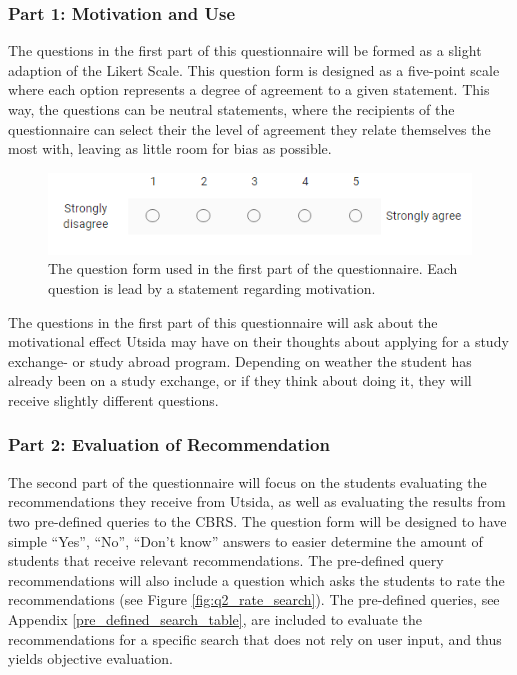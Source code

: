\subsubsection{Part 1: Motivation and Use}
The questions in the first part of this questionnaire will be formed as a slight adaption of the Likert Scale\cite{likert1932technique}. This question form is designed as a five-point scale where each option represents a degree of agreement to a given statement. This way, the questions can be neutral statements, where the recipients of the questionnaire can select their the level of agreement they relate themselves the most with, leaving as little room for bias as possible. 

\begin{figure}[H]
    \centering
    \includegraphics[width=1\textwidth]{fig/q2_question_form.PNG}
    \caption{The question form used in the first part of the questionnaire. Each question is lead by a statement regarding motivation.}
    \label{fig:q2_question_form}
\end{figure}

The questions in the first part of this questionnaire will ask about the motivational effect Utsida may have on their thoughts about applying for a study exchange- or study abroad program. Depending on weather the student has already been on a study exchange, or if they think about doing it, they will receive slightly different questions.

\subsubsection{Part 2: Evaluation of Recommendation}

The second part of the questionnaire will focus on the students evaluating the recommendations they receive from Utsida, as well as evaluating the results from two pre-defined queries to the CBRS. The question form will be designed to have simple \enquote{Yes}, \enquote{No}, \enquote{Don't know} answers to easier determine the amount of students that receive relevant recommendations. The pre-defined query recommendations will also include a question which asks the students to rate the recommendations (see Figure \ref{fig:q2_rate_search}). The pre-defined queries, see Appendix \ref{pre_defined_search_table}, are included to evaluate the recommendations for a specific search that does not rely on user input, and thus yields objective evaluation. 

